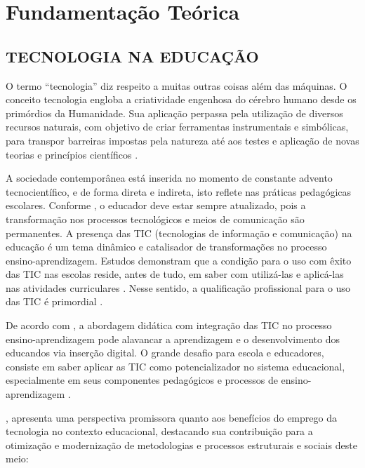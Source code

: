 
\chapter{\textbf{Fundamentação Teórica}} %
\sloppy %

\section{TECNOLOGIA NA EDUCAÇÃO}

O termo ``tecnologia'' diz respeito a muitas outras coisas além das máquinas. O conceito tecnologia engloba a criatividade engenhosa do cérebro humano desde os primórdios da Humanidade. Sua aplicação perpassa pela utilização de diversos recursos naturais, com objetivo de criar ferramentas instrumentais e simbólicas, para transpor barreiras impostas pela natureza até aos testes e aplicação de novas teorias e princípios científicos \cite{kenski2007educaccao}.

A sociedade contemporânea está inserida no momento de constante advento tecnocientífico, e de forma direta e indireta, isto reflete nas práticas pedagógicas escolares. Conforme , o educador deve estar sempre atualizado, pois a transformação nos processos tecnológicos e meios de comunicação são permanentes. A presença das TIC (tecnologias de informação e comunicação) na educação é um tema dinâmico e catalisador de transformações no processo ensino-aprendizagem. Estudos demonstram que a condição para o uso com êxito das TIC nas escolas reside, antes de tudo, em saber com utilizá-las e aplicá-las nas atividades curriculares \cite{noeth2004evaluating}. Nesse sentido, a qualificação profissional para o uso das TIC é primordial \cite{david2008padroes}.

De acordo com , a abordagem didática com integração das TIC no processo ensino-aprendizagem pode alavancar a aprendizagem e o desenvolvimento dos educandos via inserção digital. O grande desafio para escola e educadores, consiste em saber aplicar as TIC como potencializador no sistema educacional, especialmente em seus componentes pedagógicos e processos de ensino-aprendizagem \cite{libaneoorganizacao}.

, apresenta uma perspectiva promissora quanto aos benefícios do emprego da tecnologia no contexto educacional, destacando sua contribuição para a otimização e modernização de metodologias e processos estruturais e sociais deste meio:

